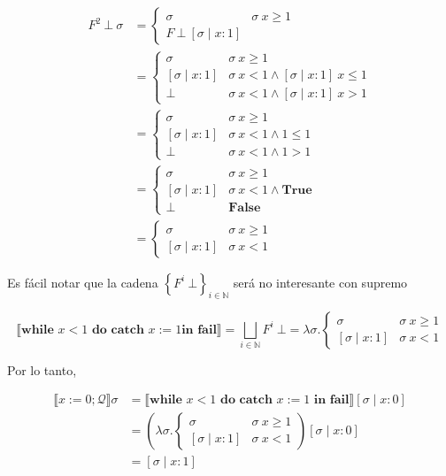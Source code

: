 \documentclass[a4paper, 12pt]{article}
\begin{document}
\begin{align*}
  F^2 ~ \bot  ~ \sigma
  &=\begin{cases}
    \sigma & \sigma ~ x \geq 1 \\ 
    F ~ \bot ~ [\sigma \mid x : 1]
  \end{cases} \\ 
  &=\begin{cases}
    \sigma & \sigma ~ x \geq 1 \\ 
    [\sigma \mid x : 1] & \sigma ~ x < 1 \land [\sigma \mid x : 1] ~ x \leq 1 \\ 
    \bot & \sigma ~ x < 1 \land [\sigma \mid x : 1] ~ x > 1
  \end{cases} \\ 
  &=\begin{cases}
    \sigma & \sigma ~ x \geq 1 \\ 
    [\sigma \mid x : 1] & \sigma ~ x < 1 \land 1 \leq 1 \\ 
    \bot & \sigma ~ x < 1 \land 1 > 1
  \end{cases}\\
  &=\begin{cases}
    \sigma & \sigma ~ x \geq 1 \\ 
    [\sigma \mid x : 1] & \sigma ~ x < 1 \land \textbf{True} \\ 
    \bot & \textbf{False}
  \end{cases}\\ 
  &=\begin{cases}
    \sigma & \sigma ~ x \geq 1 \\ 
    [\sigma \mid x : 1] & \sigma ~ x < 1 
  \end{cases}
\end{align*} 

Es fácil notar que la cadena $\left\{ F^i ~ \bot \right\}_{i \in \mathbb{N}} $
será no interesante con supremo 

\begin{equation*}
  \llbracket \textbf{while } x < 1 \textbf{ do } \textbf{catch } x :=1 \textbf{
  in fail} \rrbracket = \bigsqcup_{i \in \mathbb{N}} F^i ~ \bot  =
  \lambda\sigma.\begin{cases}
    \sigma & \sigma ~ x \geq 1 \\ 
    [\sigma \mid x : 1] & \sigma ~ x < 1
  \end{cases}
\end{equation*}

Por lo tanto, 

\begin{align*}
  \llbracket x:=0;\mathcal{Q} \rrbracket\sigma  
  &= \llbracket \textbf{while } x < 1 \textbf{ do } \textbf{catch } x := 1
  \textbf{ in fail} \rrbracket[\sigma \mid x : 0] \\ 
  &=\left( \lambda\sigma.\begin{cases}
      \sigma & \sigma ~ x \geq 1 \\ 
      [\sigma \mid x : 1] &\sigma~ x < 1
  \end{cases} \right) [\sigma \mid x : 0] \\ 
  &=[\sigma \mid x : 1]
\end{align*}
\end{document}
